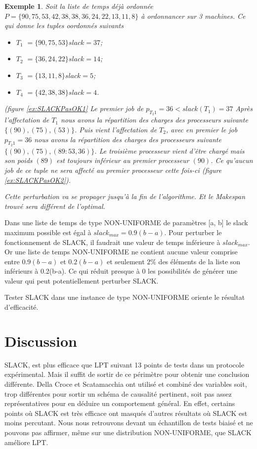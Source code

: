 \documentclass[a4paper,12pt]{report}
\theoremstyle{plain}				%
\newtheorem{example}{Exemple}
\theoremstyle{definition}				%
\begin{document}
\begin{example}
 
Soit la liste de temps déjà ordonnée $P = \{90, 75, 53, 42, 38, 38, 36, 24, 22, 13, 11, 8\}$ à ordonnancer sur 3 machines. Ce qui donne les tuples oordonnés suivants  
\begin{itemize}
	\item $T_1$ $=\{90, 75, 53\} slack = 37$; 
	\item $T_2$ $=\{36, 24, 22\} slack = 14$; 
	\item $T_3$ $=\{13, 11, 8\} slack = 5$;
	\item $T_4$ $=\{42, 38, 38\} slack = 4$.
\end{itemize}
(figure \ref{ex:SLACKPasOK1}
Le premier job de $p_{T_2 1}=36 < slack(T_1)=37$ 
Après l'affectation de $T_1$ nous avons la répartition des charges des 
 processeurs suivante $\{(90), (75), (53)\}$.
Puis vient l'affectation de $T_2$, avec en premier le job $p_{T_2 1}=36$
nous avons la répartition des charges des processeurs suivante $\{(90), (75), (89 : 53,36)\}$. Le troisième processeur vient d'être chargé mais son poids $(89)$ est toujours inférieur au premier processeur $(90)$. Ce qu'aucun job de ce tuple ne sera affecté au premier processeur cette fois-ci (figure \ref{ex:SLACKPasOK2}).

Cette perturbation va se propager jusqu’à la fin de l'algorithme. Et le Makespan trouvé sera différent de l'optimal. 
\end{example}

Dans une liste de temps de type NON-UNIFORME de paramètres [a, b] le slack maximum possible 
  est égal à $slack_{max} = 0.9(b-a)$. 
Pour perturber le fonctionnement de SLACK, il faudrait une valeur de temps inférieure à $slack_{max}$. 
Or une liste de temps NON-UNIFORME ne contient aucune valeur comprise entre $0.9(b-a)$ et $0.2(b-a)$ 
  et seulement $2\%$ des éléments de la liste son inférieurs à 0.2(b-a). 
Ce qui réduit presque à $0$ les possibilités de générer une valeur qui peut potentiellement perturber SLACK.


Tester SLACK dans une instance de type NON-UNIFORME oriente le résultat d'efficacité.
           



\section{Discussion} \label{sec:discussion}

SLACK, est plus efficace que LPT suivant 13 points de tests 
  dans un protocole expérimental. 
Mais il suffit de sortir de ce périmètre pour obtenir 
  une conclusion différente. 
Della Croce et Scatamacchia ont utilisé et combiné des variables 
  soit, trop différentes pour sortir un schéma de causalité pertinent, 
  soit pas assez représentatives pour en déduire un comportement général.  
En effet, certains points où SLACK est très efficace ont masqués 
  d'autres résultats où SLACK est moins percutant. 
Nous nous retrouvons devant un échantillon de tests biaisé et ne pouvons pas affirmer, même sur une distribution NON-UNIFORME, que SLACK améliore LPT. 
\end{document}

